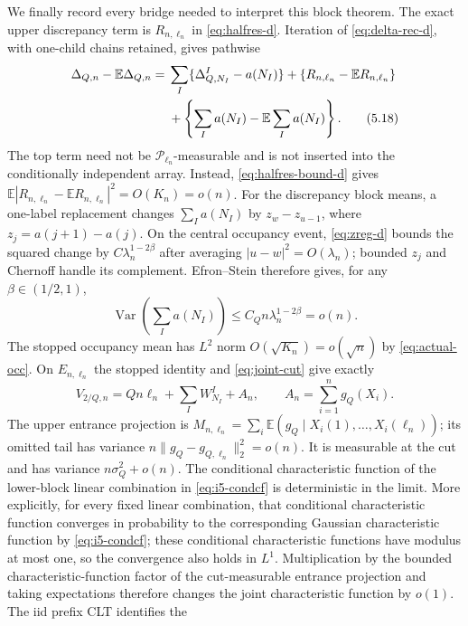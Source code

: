 \documentclass[11pt]{article}
\numberwithin{equation}{section}
\newcommand{\1}{\mathbf 1}\newcommand{\F}{\mathcal F}\newcommand{\D}{\mathcal D}
\begin{document}
We finally record every bridge needed to interpret this block theorem.  The
exact upper discrepancy term is $R_{n,\ell_n}$ in \eqref{eq:halfres-d}.
Iteration of \eqref{eq:delta-rec-d}, with one-child chains retained, gives
pathwise
\begin{align}
 \Delta_{Q,n}-\mathbb E\Delta_{Q,n}
 ={}&\sum_I\{\Delta_{Q,N_I}^{I}-a(N_I)\}
   +\{R_{n,\ell_n}-\mathbb ER_{n,\ell_n}\}\notag\\
 &+\left\{\sum_Ia(N_I)-\mathbb E\sum_Ia(N_I)\right\}.       \tag{5.18}\label{eq:i5-delta-cut}
\end{align}
The top term need not be $\mathcal P_{\ell_n}$-measurable and is not
inserted into the conditionally independent array.  Instead,
\eqref{eq:halfres-bound-d} gives
$\mathbb E|R_{n,\ell_n}-\mathbb ER_{n,\ell_n}|^2=O(K_n)=o(n)$.
For the discrepancy block means, a one-label replacement changes
$\sum_Ia(N_I)$ by $z_w-z_{u-1}$, where $z_j=a(j+1)-a(j)$.  On the central
occupancy event, \eqref{eq:zreg-d} bounds the squared change by
$C\lambda_n^{1-2\beta}$ after averaging $|u-w|^2=O(\lambda_n)$; bounded
$z_j$ and Chernoff handle its complement.  Efron--Stein therefore gives,
for any $\beta\in(1/2,1)$,
\begin{equation}
 \operatorname {Var}\!\left(\sum_Ia(N_I)\right)
 \le C_Q n\lambda_n^{1-2\beta}=o(n).                   \tag{5.19}\label{eq:i5-amean}
\end{equation}
The stopped occupancy mean has $L^2$ norm $O(\sqrt {K_n})=o(\sqrt n)$ by
\eqref{eq:actual-occ}.  On $E_{n,\ell_n}$ the stopped identity and
\eqref{eq:joint-cut} give exactly
\[
 V_{2/Q,n}=Qn\ell_n+\sum_IW_{N_I}^{I}+A_n,
 \qquad A_n=\sum_{i=1}^ng_Q(X_i).
\]
The upper entrance projection is
$M_{n,\ell_n}=\sum_i\mathbb E(g_Q\mid X_i(1),\ldots,X_i(\ell_n))$;
its omitted tail has variance $n\|g_Q-g_{Q,\ell_n}\|_2^2=o(n)$.
It is measurable at the cut and has variance $n\sigma_Q^2+o(n)$.  The
conditional characteristic function of the lower-block linear combination in
\eqref{eq:i5-condcf} is deterministic in the limit.  More explicitly, for
every fixed linear combination, that conditional characteristic function
converges in probability
to the corresponding Gaussian characteristic function by
\eqref{eq:i5-condcf}; these conditional characteristic functions have modulus
at most one, so the convergence also holds in $L^1$.  Multiplication by the
bounded characteristic-function factor of the cut-measurable entrance
projection and taking expectations therefore changes the joint
characteristic function by $o(1)$.  The iid prefix CLT identifies the
\end{document}
